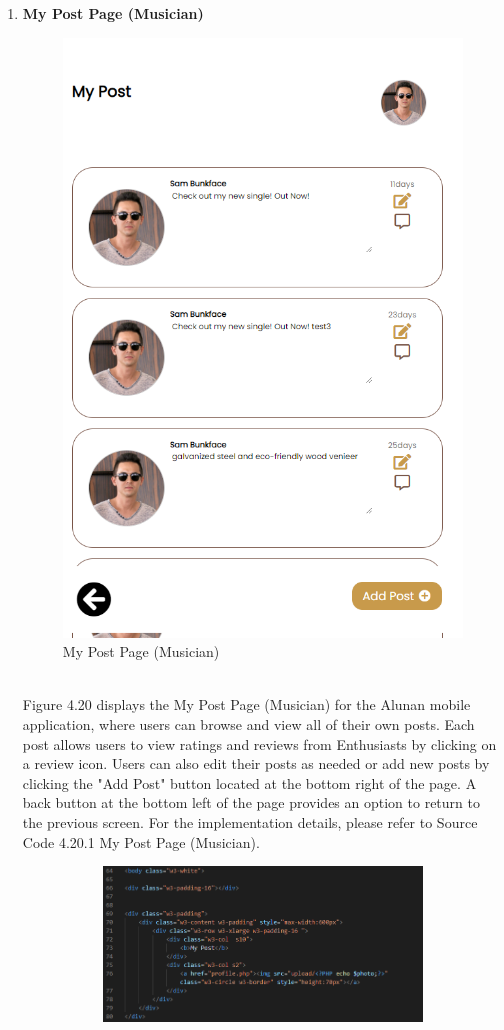\begin{enumerate}[1.]
    \item \textbf{My Post Page (Musician)}
    \begin{figure}[h]
        \centering
        \includegraphics[width=0.5\linewidth]{mainmatter/images/frontend/ss/My Post (Musician).png}
        \caption{My Post Page (Musician)}
        \label{fig:myfig59}
    \end{figure} \\
    Figure 4.20 displays the My Post Page (Musician) for the Alunan mobile application, where users can browse and view all of their own posts. Each post allows users to view ratings and reviews from Enthusiasts by clicking on a review icon. Users can also edit their posts as needed or add new posts by clicking the "Add Post" button located at the bottom right of the page. A back button at the bottom left of the page provides an option to return to the previous screen. For the implementation details, please refer to Source Code 4.20.1 My Post Page (Musician).
    \clearpage
    \begin{figure}[h]\ContinuedFloat
        \centering
        \begin{subfigure}[b]{0.8\textwidth}
            \centering
            \includegraphics[width=\textwidth]{mainmatter/images/frontend/code/mpost.png}

\end{subfigure}
\end{figure}
\end{enumerate}
